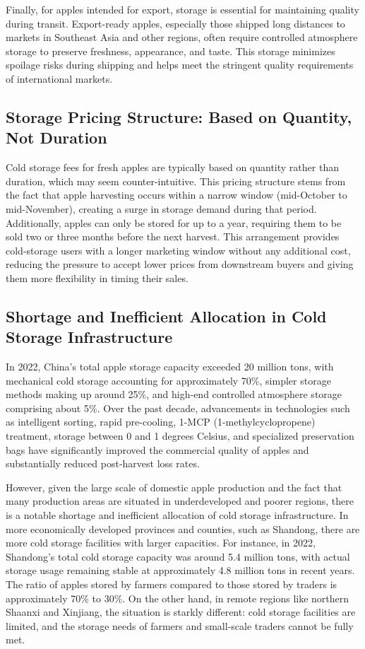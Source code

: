 Finally, for apples intended for export, storage is essential for maintaining quality during transit. Export-ready apples, especially those shipped long distances to markets in Southeast Asia and other regions, often require controlled atmosphere storage to preserve freshness, appearance, and taste. This storage minimizes spoilage risks during shipping and helps meet the stringent quality requirements of international markets.




\subsection{Storage Pricing Structure: Based on Quantity, Not Duration} 
\noindent Cold storage fees for fresh apples are typically based on quantity rather than duration, which may seem counter-intuitive. This pricing structure stems from the fact that apple harvesting occurs within a narrow window (mid-October to mid-November), creating a surge in storage demand during that period. Additionally, apples can only be stored for up to a year, requiring them to be sold two or three months before the next harvest. This arrangement provides cold-storage users with a longer marketing window without any additional cost, reducing the pressure to accept lower prices from downstream buyers and giving them more flexibility in timing their sales.

\subsection{Shortage and Inefficient Allocation in Cold Storage Infrastructure} 
\noindent In 2022, China's total apple storage capacity exceeded 20 million tons, with mechanical cold storage accounting for approximately 70\%, simpler storage methods making up around 25\%, and high-end controlled atmosphere storage comprising about 5\%. Over the past decade, advancements in technologies such as intelligent sorting, rapid pre-cooling, 1-MCP (1-methylcyclopropene) treatment, storage between 0 and 1 degrees Celsius, and specialized preservation bags have significantly improved the commercial quality of apples and substantially reduced post-harvest loss rates.

However, given the large scale of domestic apple production and the fact that many production areas are situated in underdeveloped and poorer regions, there is a notable shortage and inefficient allocation of cold storage infrastructure. In more economically developed provinces and counties, such as Shandong, there are more cold storage facilities with larger capacities. For instance, in 2022, Shandong's total cold storage capacity was around 5.4 million tons, with actual storage usage remaining stable at approximately 4.8 million tons in recent years. The ratio of apples stored by farmers compared to those stored by traders is approximately 70\% to 30\%. On the other hand, in remote regions like northern Shaanxi and Xinjiang, the situation is starkly different: cold storage facilities are limited, and the storage needs of farmers and small-scale traders cannot be fully met.

